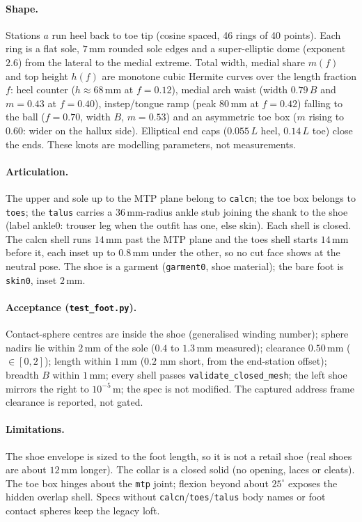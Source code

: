\paragraph{Shape.} Stations $a$ run heel back to toe tip (cosine spaced, 46
rings of 40 points). Each ring is a flat sole, $7$\,mm rounded sole edges and a
super-elliptic dome (exponent $2.6$) from the lateral to the medial extreme.
Total width, medial share $m(f)$ and top height $h(f)$ are monotone cubic
Hermite curves over the length fraction $f$: heel counter ($h\approx68$\,mm at
$f=0.12$), medial arch waist (width $0.79\,B$ and $m=0.43$ at $f=0.40$),
instep/tongue ramp (peak $80$\,mm at $f=0.42$) falling to the ball
($f=0.70$, width $B$, $m=0.53$) and an asymmetric toe box ($m$ rising to
$0.60$: wider on the hallux side). Elliptical end caps ($0.055\,L$ heel,
$0.14\,L$ toe) close the ends. These knots are modelling parameters, not
measurements.

\paragraph{Articulation.} The upper and sole up to the MTP plane belong to
\texttt{calcn}; the toe box belongs to \texttt{toes}; the \texttt{talus} carries
a $36$\,mm-radius ankle stub joining the shank to the shoe (label ankle0: trouser leg when the outfit has one, else skin). Each shell is
closed. The calcn shell runs $14$\,mm past the MTP plane and the toes shell
starts $14$\,mm before it, each inset up to $0.8$\,mm under the other, so no cut
face shows at the neutral pose. The shoe is a garment (\texttt{garment0},
shoe material); the bare foot is \texttt{skin0}, inset $2$\,mm.

\paragraph{Acceptance (\texttt{test\_foot.py}).} Contact-sphere centres are
inside the shoe (generalised winding number); sphere nadirs lie within $2$\,mm
of the sole ($0.4$ to $1.3$\,mm measured); clearance $0.50$\,mm ($\in[0,2]$);
length within $1$\,mm ($0.2$ mm short, from the end-station offset); breadth
$B$ within $1$\,mm; every shell passes \texttt{validate\_closed\_mesh}; the
left shoe mirrors the right to $10^{-5}$\,m; the spec is not modified. The
captured address frame clearance is reported, not gated.

\paragraph{Limitations.} The shoe envelope is sized to the foot length, so it
is not a retail shoe (real shoes are about $12$\,mm longer). The collar is a
closed solid (no opening, laces or cleats). The toe box hinges about the
\texttt{mtp} joint; flexion beyond about $25^\circ$ exposes the hidden overlap
shell. Specs without \texttt{calcn}/\texttt{toes}/\texttt{talus} body names or
foot contact spheres keep the legacy loft.

